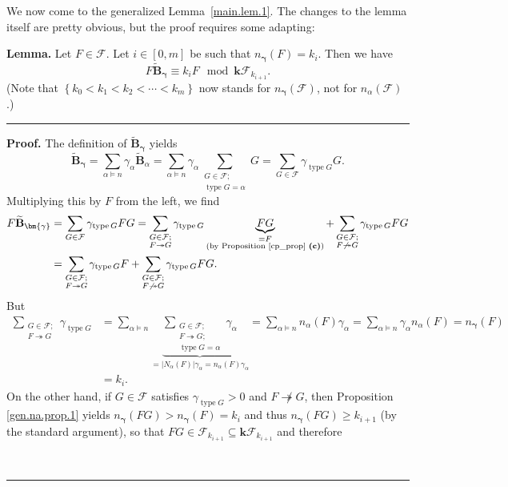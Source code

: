 \documentclass[12pt]{article}
\theoremstyle{definition}%
\newtheorem{lem}[thm]{Lemma}
\theoremstyle{definition}%
\theoremstyle{remark}%
\newcommand{\tup}[1]{\left( #1 \right)}
\newcommand{\interval}[1]{\left[ #1 \right]} %
\newcommand{\set}[1]{\left\{ #1 \right\}}
\newcommand{\card}[1]{\left| #1 \right|} %
\newcommand{\kk}{\mathbf{k}}
\newcommand{\kf}{\kk\mathcal{F}}
\newcommand{\BBt}{\widetilde{\mathbf{B}}}
\newcommand{\BBta}{\widetilde{\mathbf{B}}_{\alpha}}
\newcommand{\CF}{\mathcal{F}}
\newcommand{\bgamma}{\bm{\gamma}}
\newcommand{\na}{n_{ \alpha } }%
\newcommand{\Na}{N_{ \alpha } }%
\newcommand{\type}{\operatorname{type}}
\newcommand{\con}{\twoheadrightarrow} %
\newenvironment{lem}[1][Lemma]{\noindent\textbf{#1.} }{\ \rule{0.5em}{0.5em}}
\newenvironment{proof}[1][Proof]{\noindent\textbf{#1.} }{\ \rule{0.5em}{0.5em}}
\begin{document}
We now come to the generalized Lemma~\ref{main.lem.1}. The changes to the lemma itself are pretty obvious, but the proof requires some adapting:

\begin{lem}
    \label{gen.lem.1}
    Let $ F \in \CF $. Let $i \in \interval{0, m}$ be such that $n_{\bgamma}\tup{F} = k_i$. Then we have
    \[
    F\BBt_{\bgamma} \equiv k_i F  \mod \kf_{k_{i+1}}.
    \]
	(Note that $ \set{k_0 < k_1 < k_2 < \cdots < k_m} $ now stands for $n_{\bgamma}\tup{\CF}$, not for $\na\tup{\CF}$.)
\end{lem}

\begin{proof}
   The definition of $\BBt_{\bgamma}$ yields
   \[
   \BBt_{\bgamma}
   = \sum_{\alpha \models n} \gamma_\alpha \BBta
   = \sum_{\alpha \models n} \gamma_\alpha \sum_{\substack{G \in \CF; \\ \type G = \alpha}}G
   = \sum_{G \in \CF} \gamma_{\type G} G.
   \]
   Multiplying this by $F$ from the left, we find
   \begin{align}
       F\BBt_{\bgamma}
	   &= \sum_{G \in \CF} \gamma_{\type G} FG
	   = \sum_{\substack{G \in \CF; \\ F \con G}} \gamma_{\type G} \underbrace{FG}_{\substack{=F \\ \text{(by Proposition \ref{cp_prop} \textbf{(c)})}}}
	   + \sum_{\substack{G \in \CF; \\ F \not\con G}} \gamma_{\type G} FG
	   \nonumber\\
       &= \sum_{\substack{G \in \CF; \\ F \con G}} \gamma_{\type G} F + \sum_{\substack{G \in \CF; \\ F \not\con G}} \gamma_{\type G} FG.
	   \label{eq.gen.lem.1.1}
   \end{align}
   But
   \begin{align}
		\sum_{\substack{G \in \CF; \\ F \con G}} \gamma_{\type G}
		&= \sum_{\alpha \models n} \underbrace{\sum_{\substack{G \in \CF; \\ F \con G; \\ \type G = \alpha}} \gamma_\alpha}_{= \card{\Na\tup{F}} \gamma_\alpha = \na\tup{F} \gamma_\alpha}
		= \sum_{\alpha \models n} \na\tup{F} \gamma_\alpha
		= \sum_{\alpha \models n} \gamma_\alpha \na\tup{F}
		= n_{\bgamma}\tup{F}
		\nonumber \\
		&= k_i.
		\label{eq.gen.lem.1.3}
   \end{align}
   On the other hand, if $G \in \CF$ satisfies $\gamma_{\type G} > 0$ and $F \not\con G$, then Proposition \ref{gen.na.prop.1} yields $ n_{\bgamma}\tup{ FG } > n_{\bgamma}\tup{ F } = k_i $ and thus $ n_{\bgamma}\tup{ FG } \ge k_{i+1}$ (by the standard argument), so that $FG \in \CF_{k_{i+1}} \subseteq \kf_{k_{i+1}}$ and therefore

\end{proof}
\end{document}
